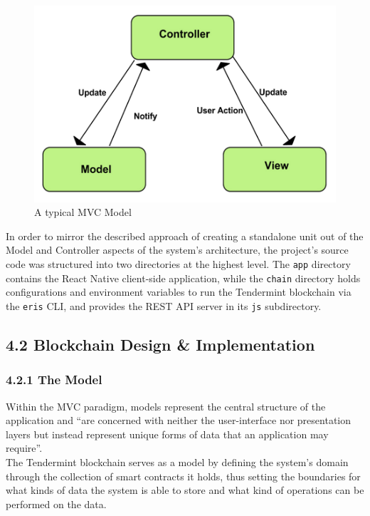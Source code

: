 \documentclass[12pt]{report}
\begin{document}
\begin{figure}[htbp]
\centering
\includegraphics{../diagrams/mvc.png}
\caption{A typical MVC Model\cite{1mvcfigure}}
\end{figure}

In order to mirror the described approach of creating a standalone unit
out of the Model and Controller aspects of the system's architecture,
the project's source code was structured into two directories at the
highest level. The \texttt{app} directory contains the React Native
client-side application, while the \texttt{chain} directory holds
configurations and environment variables to run the Tendermint
blockchain via the \texttt{eris} CLI, and provides the REST API server
in its \texttt{js} subdirectory.

\subsection{4.2 Blockchain Design \&
Implementation}\label{blockchain-design-implementation}

\subsubsection{4.2.1 The Model}\label{the-model}

Within the MVC paradigm, models represent the central structure of the
application and ``are concerned with neither the user-interface nor
presentation layers but instead represent unique forms of data that an
application may
require''\cite{osmani2012learning}.\\
The Tendermint blockchain serves as a model by defining the system's
domain through the collection of smart contracts it holds, thus setting
the boundaries for what kinds of data the system is able to store and
what kind of operations can be performed on the data.
\end{document}
